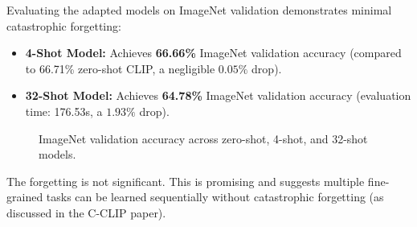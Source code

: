 \documentclass[letterpaper,11pt,leqno]{article}
\begin{document}
Evaluating the adapted models on ImageNet validation demonstrates minimal catastrophic forgetting:
\begin{itemize}
    \item \textbf{4-Shot Model:} Achieves \textbf{66.66\%} ImageNet validation accuracy (compared to 66.71\% zero-shot CLIP, a negligible $0.05\%$ drop).
    \item \textbf{32-Shot Model:} Achieves \textbf{64.78\%} ImageNet validation accuracy (evaluation time: 176.53s, a $1.93\%$ drop).
\end{itemize}

\begin{figure}[H]
    \centering
    \caption{ImageNet validation accuracy across zero-shot, 4-shot, and 32-shot models.}
    \label{fig:forgetting}
\end{figure}

The forgetting is not significant. This is promising and suggests multiple fine-grained tasks can be learned sequentially without catastrophic forgetting (as discussed in the C-CLIP paper).
\end{document}

